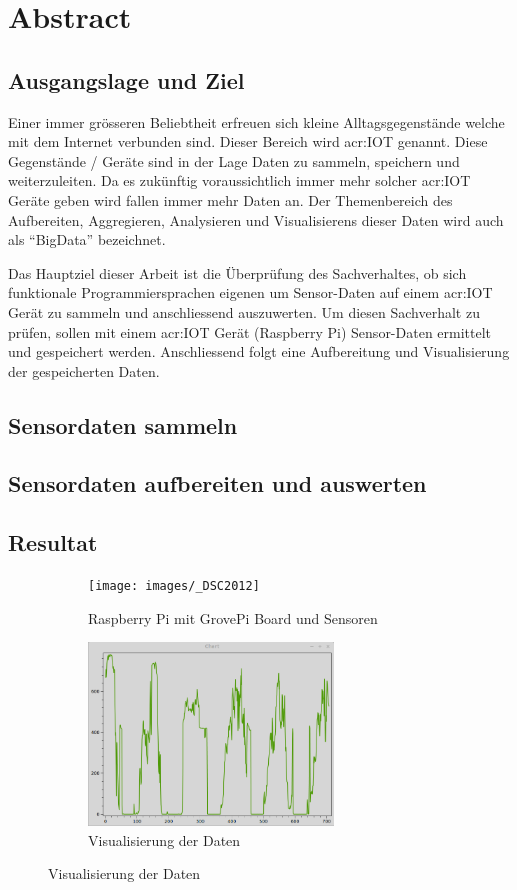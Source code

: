 
\section*{Abstract}

\subsection*{Ausgangslage und Ziel}
Einer immer grösseren Beliebtheit erfreuen sich kleine Alltagsgegenstände welche mit dem Internet verbunden sind. Dieser Bereich wird \gls{acr:IOT} genannt. Diese Gegenstände / Geräte sind in der Lage Daten zu sammeln, speichern und weiterzuleiten. Da es zukünftig voraussichtlich immer mehr solcher \gls{acr:IOT} Geräte geben wird fallen immer mehr Daten an. Der Themenbereich des Aufbereiten, Aggregieren, Analysieren und Visualisierens dieser Daten wird auch als "`BigData"' bezeichnet.

Das Hauptziel dieser Arbeit ist die Überprüfung des Sachverhaltes, ob sich funktionale Programmiersprachen eigenen um Sensor-Daten auf einem \gls{acr:IOT} Gerät zu sammeln und anschliessend auszuwerten. Um diesen Sachverhalt zu prüfen, sollen mit einem \gls{acr:IOT} Gerät (Raspberry Pi) Sensor-Daten ermittelt und gespeichert werden. Anschliessend folgt eine Aufbereitung und Visualisierung der gespeicherten Daten.

\subsection*{Sensordaten sammeln}


\subsection*{Sensordaten aufbereiten und auswerten}

\subsection*{Resultat}

\begin{figure}[htb]
	\begin{subfigure}[b]{0.45\linewidth}
		\centering
		\texttt{[image: images/\_DSC2012]}
		\caption{Raspberry Pi mit GrovePi Board und Sensoren}
	\end{subfigure}
	\begin{subfigure}[b]{.45\linewidth}
		\centering
		\includegraphics[width=6.5cm]{images/resultat}
		\caption{Visualisierung der Daten}
	\end{subfigure}
\end{figure}
